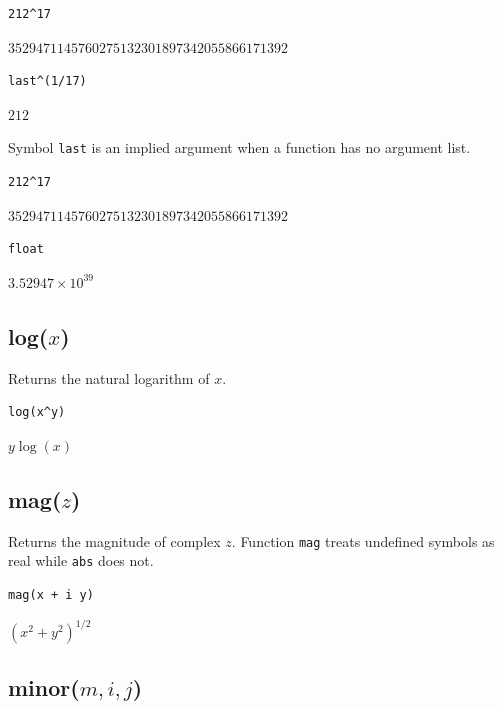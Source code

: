 \documentclass[12pt]{article}
\begin{document}
{\color{blue}
\begin{verbatim}
212^17
\end{verbatim}
}

\noindent
$3529471145760275132301897342055866171392$

{\color{blue}
\begin{verbatim}
last^(1/17)
\end{verbatim}
}

\noindent
$212$

\bigskip
\noindent
Symbol \verb$last$ is an implied argument when a function has no argument list.

{\color{blue}
\begin{verbatim}
212^17
\end{verbatim}
}

\noindent
$3529471145760275132301897342055866171392$

{\color{blue}
\begin{verbatim}
float
\end{verbatim}
}

\noindent
$\displaystyle 3.52947\times10^{39}$

\subsection*{log($x$)}

Returns the natural logarithm of $x$.

{\color{blue}
\begin{verbatim}
log(x^y)
\end{verbatim}
}

\noindent
$y\log(x)$

\subsection*{mag($z$)}

Returns the magnitude of complex $z$.
Function {\tt mag} treats undefined symbols as real while {\tt abs} does not.

{\color{blue}
\begin{verbatim}
mag(x + i y)
\end{verbatim}
}

\noindent
$\displaystyle (x^2+y^2)^{1/2}$

\subsection*{minor($m,i,j$)}
\end{document}
